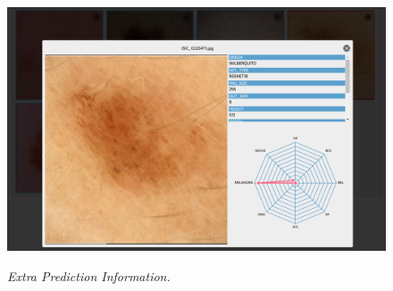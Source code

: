 \newpage

\begin{figure}[H]
  \centering
  \begin{adjustbox}{width=\textwidth, trim={0.05cm 0cm 0.25cm 0cm}, clip}
    \includegraphics[]{imatges/results/extra-inf-popup.png}
  \end{adjustbox}
  \caption[Extra Prediction Information]{\textit{Extra Prediction Information.}}
  {\label{fig:extra-inf-popup}}
\end{figure}

\newpage
